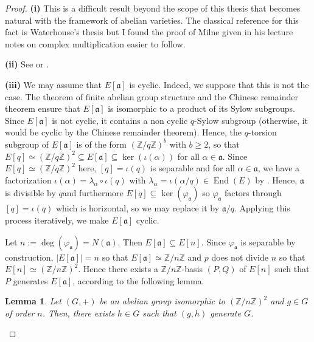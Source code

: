 \documentclass[a4paper,10pt]{report}
\theoremstyle{definition}
\theoremstyle{plain}
\newtheorem{Lemma}[Definition]{Lemma}
\theoremstyle{definition}
\newcommand{\Z}{\mathbb{Z}}
\renewcommand{\(}{\left(}
\renewcommand{\)}{\right)}
\newcommand{\mf}[1]{\mathfrak{#1}}
\DeclareMathOperator{\End}{End}
\begin{document}
\begin{proof}
\textbf{(i)} This is a difficult result beyond the scope of this thesis that becomes natural with the framework of abelian varieties. The classical reference for this fact is Waterhouse's thesis \cite[Proposition 3.12]{Waterhouse1969} but I found the proof of Milne given in his lecture notes on complex multiplication \cite[Proposition 7.28]{Milne_CM} easier to follow.

\textbf{(ii)} See \cite[Theorem 3.15]{Waterhouse1969} or \cite[Proposition 7.29]{Milne_CM}.

\textbf{(iii)} We may assume that $E[\mf{a}]$ is cyclic. Indeed, we suppose that this is not the case. The theorem of finite abelian group structure and the Chinese remainder theorem ensure that $E[\mf{a}]$ is isomorphic to a product of its Sylow subgroups. Since $E[\mf{a}]$ is not cyclic, it contains a non cyclic $q$-Sylow subgroup (otherwise, it would be cyclic by the Chinese remainder theorem). Hence, the $q$-torsion subgroup of $E[\mf{a}]$ is of the form $(\Z/q\Z)^b$ with $b\geq 2$, so that $E[q]\simeq(\Z/q\Z)^2\subseteq E[\mf{a}]\subseteq\ker(\iota(\alpha))$ for all $\alpha\in\mf{a}$. Since $E[q]\simeq(\Z/q\Z)^2$ here, $[q]=\iota(q)$ is separable and for all $\alpha\in\mf{a}$, we have a factorization $\iota(\alpha)=\lambda_\alpha\circ \iota(q)$ with $\lambda_\alpha=\iota(\alpha/q)\in\End(E)$ by \cite[Corollary III.4.11]{Silverman1}. Hence, $\mf{a}$ is divisible by $q$and furthermore $E[q]\subseteq \ker(\varphi_{\mf{a}})$ so $\varphi_{\mf{a}}$ factors through $[q]=\iota(q)$ which is horizontal, so we may replace it by $\mf{a}/q$. Applying this process iteratively, we make $E[\mf{a}]$ cyclic. 

Let $n:=\deg(\varphi_{\mf{a}})=N(\mf{a})$. Then $E[\mf{a}]\subseteq E[n]$. Since $\varphi_{\mf{a}}$ is separable by construction, $|E[\mf{a}]|=n$ so that $E[\mf{a}]\simeq\Z/n\Z$ and $p$ does not divide $n$ so that $E[n]\simeq (\Z/n\Z)^2$.  Hence there exists a $\Z/n\Z$-basis $(P,Q)$ of $E[n]$ such that $P$ generates $E[\mf{a}]$, according to the following lemma.

\begin{Lemma}
Let $(G,+)$ be an abelian group isomorphic to $(\Z/n\Z)^2$ and $g\in G$ of order $n$. Then, there exists $h\in G$ such that $(g,h)$ generate $G$.
\end{Lemma}


\end{proof}
\end{document}
